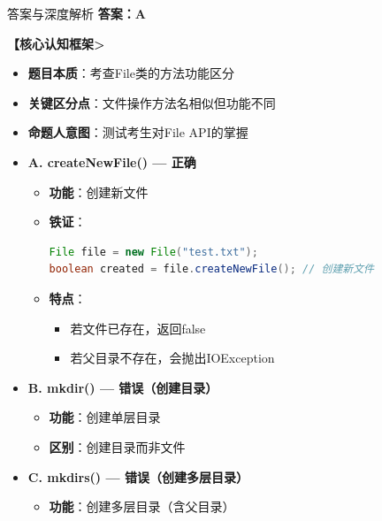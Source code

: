 \documentclass[12pt, a4paper]{ctexart}
\begin{document}
\begin{bluebox}{答案与深度解析}
	\textbf{答案：A}

	\textbf{【核心认知框架>}
	\begin{itemize}[label={}, leftmargin=*, nosep]
		\item \textbf{题目本质}：考查File类的方法功能区分
		\item \textbf{关键区分点}：文件操作方法名相似但功能不同
		\item \textbf{命题人意图}：测试考生对File API的掌握
	\end{itemize}

	\begin{itemize}[label={}, nosep]
		\item \textbf{A. createNewFile() — 正确}
		\begin{itemize}[label={}, leftmargin=*, nosep]
			\item \textbf{功能}：创建新文件
			\item \textbf{铁证}：
			      \begin{lstlisting}[language=Java]
File file = new File("test.txt");
boolean created = file.createNewFile(); // 创建新文件
      \end{lstlisting}

			\item \textbf{特点}：
			      \begin{itemize}[label={}, nosep]
				      \item 若文件已存在，返回false
				      \item 若父目录不存在，会抛出IOException
			      \end{itemize}
		\end{itemize}

		\item \textbf{B. mkdir() — 错误（创建目录）}
		\begin{itemize}[label={}, leftmargin=*, nosep]
			\item \textbf{功能}：创建单层目录
			\item \textbf{区别}：创建目录而非文件
		\end{itemize}

		\item \textbf{C. mkdirs() — 错误（创建多层目录）}
		\begin{itemize}[label={}, leftmargin=*, nosep]
			\item \textbf{功能}：创建多层目录（含父目录）
		\end{itemize}


\end{itemize}
\end{bluebox}
\end{document}
